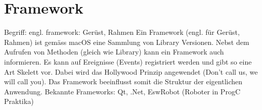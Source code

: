 \section{Framework}
Begriff: engl. framework: Gerüst, Rahmen
Ein Framework (engl. für Gerüst, Rahmen) ist gemäss macOS eine Sammlung von Library Versionen. Nebst dem Aufrufen von Methoden (gleich wie  Library) kann ein Framework auch informieren. Es kann auf Ereignisse (Events) registriert werden und gibt so eine Art Skelett vor. Dabei wird das Hollywood Prinzip angewendet (Don't call us, we will call you).
Das Framework beeinflusst somit die Struktur der eigentlichen Anwendung.
Bekannte Frameworks: Qt, .Net, EswRobot (Roboter in ProgC Praktika)

% 

% 
